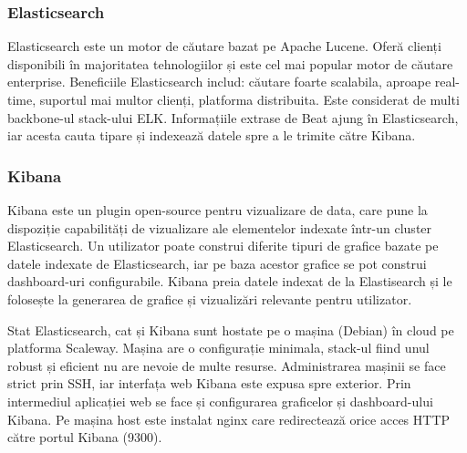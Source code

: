\documentclass[12pt]{report}
\begin{document}
			\subsubsection{Elasticsearch}
Elasticsearch este un motor de căutare bazat pe Apache Lucene. Oferă clienți disponibili în majoritatea tehnologiilor și este cel mai popular motor de căutare enterprise. Beneficiile Elasticsearch includ: căutare foarte scalabila, aproape real-time, suportul mai multor clienți, platforma distribuita. Este considerat de multi backbone-ul stack-ului ELK. Informațiile extrase de Beat ajung în Elasticsearch, iar acesta cauta tipare și indexează datele spre a le trimite către Kibana.


			\subsubsection{Kibana}
Kibana este un plugin open-source pentru vizualizare de data, care pune la dispoziție capabilități de vizualizare ale elementelor indexate într-un cluster Elasticsearch. Un utilizator poate construi diferite tipuri de grafice bazate pe datele indexate de Elasticsearch, iar pe baza acestor grafice se pot construi dashboard-uri configurabile. Kibana preia datele indexat de la Elastisearch și le folosește la generarea de grafice și vizualizări relevante pentru utilizator.

Stat Elasticsearch, cat și Kibana sunt hostate pe o mașina (Debian) în cloud pe platforma Scaleway. Mașina are o configurație minimala, stack-ul fiind unul robust și eficient nu are nevoie de multe resurse. Administrarea mașinii se face strict prin SSH, iar interfața web Kibana este expusa spre exterior. Prin intermediul aplicației web se face și configurarea graficelor și dashboard-ului Kibana. Pe mașina host este instalat nginx care redirectează orice acces HTTP către portul Kibana (9300).
\end{document}
